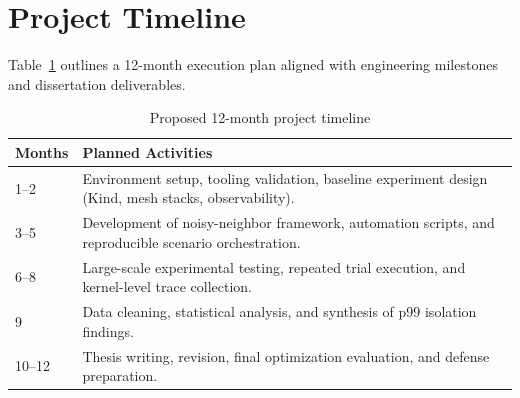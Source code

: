 \section{Project Timeline}
Table~\ref{tab:timeline} outlines a 12-month execution plan aligned with engineering milestones and dissertation deliverables.

\begin{table}[h]
  \centering
  \caption{Proposed 12-month project timeline}
  \label{tab:timeline}
  \begin{tabular}{@{}ll@{}}
    \toprule
    \textbf{Months} & \textbf{Planned Activities} \\
    \midrule
    1--2 & Environment setup, tooling validation, baseline experiment design (Kind, mesh stacks, observability). \\
    3--5 & Development of noisy-neighbor framework, automation scripts, and reproducible scenario orchestration. \\
    6--8 & Large-scale experimental testing, repeated trial execution, and kernel-level trace collection. \\
    9 & Data cleaning, statistical analysis, and synthesis of p99 isolation findings. \\
    10--12 & Thesis writing, revision, final optimization evaluation, and defense preparation. \\
    \bottomrule
  \end{tabular}
\end{table}

